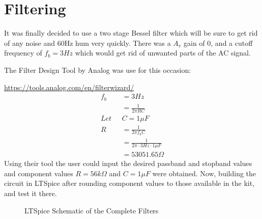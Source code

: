 \documentclass{article}
\begin{document}
\section{Filtering}
It was finally decided to use a two stage Bessel filter which will be sure to get rid of any noise and 60Hz hum very quickly. There was a $A_v$ gain of 0, and a cutoff frequency of $f_b = 3Hz$ which would get rid of unwanted parts of the AC signal.

The Filter Design Tool by Analog was use for this occasion:

\url{https://tools.analog.com/en/filterwizard/}
\begin{align}
    f_b &= 3Hz \\
    &= \frac{1}{2\pi RC}\\
    Let\text{ }&C = 1\mu F\\
    R &= \frac{1}{2\pi f_bC}\\
    &= \frac{1}{2\pi \cdot3Hz \cdot 1\mu F}\\
    &= 53051.65\Omega
\end{align}
Using their tool the user could input the desired passband and stopband values and component values $R = 56k\Omega$ and $C = 1\mu F$ were obtained. Now, building the circuit in LTSpice after rounding component values to those available in the kit, and test it there.
\begin{figure}[h]
    \centering
    \caption{LTSpice Schematic of the Complete Filters}
    \label{figure:LTSpiceFilters}
\end{figure}
\end{document}
